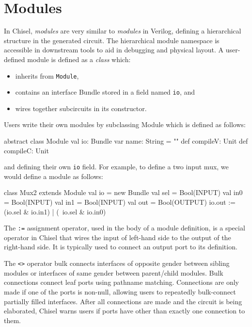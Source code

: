 \documentclass[10pt,twocolumn]{article}
\def\code#1{{\small\tt #1}}
\begin{document}
\section{Modules}

In Chisel, {\em modules} are very similar to {\em modules} in
Verilog, defining a hierarchical structure in the generated circuit.
The hierarchical module namespace is accessible in downstream tools
to aid in debugging and physical layout.  A user-defined module is
defined as a {\em class} which:
\begin{itemize}
\item inherits from \code{Module},
\item contains an interface Bundle stored in a field named \code{io}, and
\item wires together subcircuits in its constructor.
\end{itemize}

Users write their own modules by subclassing Module which is
defined as follows:

\begin{scala}
abstract class Module {
  val io: Bundle
  var name: String = ""
  def compileV: Unit
  def compileC: Unit
}
\end{scala}

\noindent
and defining their own \code{io} field.  For example, to define a two
input mux, we would define a module as follows:

\begin{scala}
class Mux2 extends Module {
  val io = new Bundle{
    val sel = Bool(INPUT)
    val in0 = Bool(INPUT)
    val in1 = Bool(INPUT)
    val out = Bool(OUTPUT)
  }
  io.out := (io.sel & io.in1) | (~io.sel & io.in0)
}
\end{scala}

\noindent
The \code{:=} assignment operator, used in the body of a
module definition, is a special operator in Chisel that wires the input of
left-hand side to the output of the right-hand side.  It is typically
used to connect an output port to its definition.

The \code{<>} operator bulk connects interfaces of opposite gender between
sibling modules or interfaces of same gender between parent/child modules. 
Bulk connections connect leaf ports using pathname matching.
Connections are only made if one of the ports is non-null,
allowing users to repeatedly bulk-connect partially filled interfaces.
After all connections are made and the circuit is being elaborated,
Chisel warns users if ports have other than exactly one connection to them.
\end{document}
